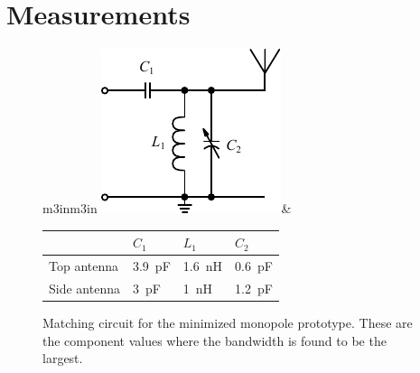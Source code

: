 \FloatBarrier
\section{Measurements}


\begin{figure}[htbp]
        \centering
        \begin{tabular}{m{3in}m{3in}}
            \centering
            \includegraphics{img/tech_sol/schematic_tuning_1}&
            \centering
            \footnotesize
            \begin{tabular}{|l|l|l|l|}
                \hline
                & $C_1$ & $L_1$ & $C_2$ \\
                \hline
              Top antenna & \SI{3.9}{pF} & \SI{1.6}{nH} & \SI{0.6}{pF} \\
                Side antenna & \SI{3}{pF} & \SI{1}{nH} & \SI{1.2}{pF} \\
                \hline
            \end{tabular}
        \end{tabular}
    \caption{Matching circuit for the minimized monopole prototype. These are the component values where the bandwidth is found to be the largest.}
    \label{fig:matching_mono_mini_meas}
\end{figure}


